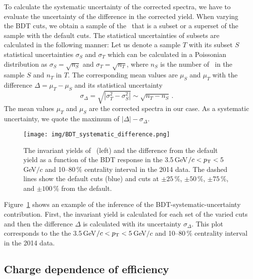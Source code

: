 To calculate the systematic uncertainty of the corrected spectra, we have to evaluate the uncertainty of the difference in the corrected yield. When varying the BDT cuts, we obtain a sample of the \Lambdac\ that is a subset or a superset of the sample with the default cuts. The statistical uncertainties of subsets are calculated in the following manner: Let us denote a sample $T$ with its subset $S$ statistical uncertainties $\sigma_S$ and $\sigma_T$ which can be calculated in a Poissonian distribution as $\sigma_S = \sqrt{n_S}$ and  $\sigma_T = \sqrt{n_T}$, where $n_S$ is the number of \Lambdac\ in the sample $S$ and $n_T$ in $T$\@. The corresponding mean values are $\mu_S$ and $\mu_T$ with the difference $\Delta = \mu_T - \mu_S$ and its statistical uncertainty
\begin{equation}
 \sigma_\Delta = \sqrt{|\sigma_T^2 - \sigma_S^2|} \sim \sqrt{n_T - n_S}\,.
\end{equation}
The mean values $\mu_T$ and $\mu_S$ are the corrected spectra in our case. As a systematic uncertainty, we quote the maximum of $|\Delta| - \sigma_\Delta$\@.

\begin{figure}[!htb]
\centering
\texttt{[image: img/BDT\_systematic\_difference.png]}
\caption[The invariant yields of \Lambdac\ and the difference from the default yield as a function of the BDT response.]{\label{BDT_syst_difference} The invariant yields of \Lambdac\ (left) and the difference from the default yield as a function of the BDT response in the 3.5$\,$GeV$/c < {p_{\mathrm{T}}} < 5\,$GeV$/c$ and 10--80$\,\%$ centrality interval in the 2014 data. The dashed lines show the default cuts (blue) and cuts at $\pm 25\,\%$, $\pm 50\,\%$, $\pm 75\,\%$, and $\pm 100\,\%$ from the default.}
\end{figure}

Figure~\ref{BDT_syst_difference} shows an example of the inference of the BDT-systematic-uncertainty contribution. First, the invariant yield is calculated for each set of the varied cuts and then the difference $\Delta$ is calculated with its uncertainty $\sigma_\Delta$. This plot corresponds to the the 3.5$\,$GeV$/c < {p_{\mathrm{T}}} < 5\,$GeV$/c$ and 10--80$\,\%$ centrality interval in the 2014 data.

\subsection{Charge dependence of efficiency\label{LcChargeDependence}}

